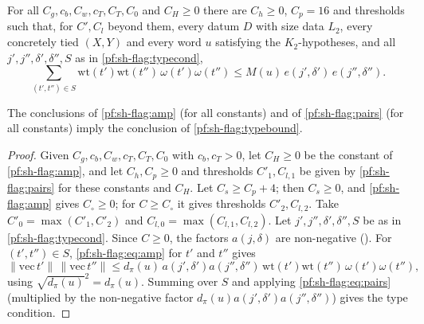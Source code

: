 \begin{proposition}\label{pf:sh-flag:pairs}
For all $C_g,c_b,C_w,c_T,C_T,C_0$ and $C_H\ge0$ there are $C_h\ge0$, $C_p=16$ and thresholds such that, for $C',C_l$ beyond them,
every datum $D$ with size data $L_2$, every concretely tied $(X,Y)$ and every word $u$ satisfying the $K_2$-hypotheses, and all
$j',j'',\delta',\delta'',S$ as in \cref{pf:sh-flag:typecond},
\begin{equation}\label{pf:sh-flag:eq:pairs}
\sum_{(t',t'')\in S}\mathrm{wt}(t')\mathrm{wt}(t'')\,\omega(t')\omega(t'')\le M(u)\,e(j',\delta')\,e(j'',\delta'').
\end{equation}
\end{proposition}

\begin{lemma}[Combination]\label{pf:sh-flag:comb}
The conclusions of \cref{pf:sh-flag:amp} (for all constants) and of \cref{pf:sh-flag:pairs} (for all constants) imply the
conclusion of \cref{pf:sh-flag:typebound}.
\end{lemma}

\begin{proof}
Given $C_g,c_b,C_w,c_T,C_T,C_0$ with $c_b,c_T>0$, let $C_H\ge0$ be the constant of \cref{pf:sh-flag:amp}, and let $C_h,C_p\ge0$
and thresholds $C'_1,C_{l,1}$ be given by \cref{pf:sh-flag:pairs} for these constants and $C_H$. Let $C_s\ge C_p+4$; then
$C_s\ge0$, and \cref{pf:sh-flag:amp} gives $C_\circ\ge0$; for $C\ge C_\circ$ it gives thresholds $C'_2,C_{l,2}$. Take
$C'_0=\max(C'_1,C'_2)$ and $C_{l,0}=\max(C_{l,1},C_{l,2})$. Let $j',j'',\delta',\delta'',S$ be as in \cref{pf:sh-flag:typecond}. Since
$C\ge0$, the factors $a(j,\delta)$ are non-negative (). For
$(t',t'')\in S$, \eqref{pf:sh-flag:eq:amp} for $t'$ and $t''$ gives
\[
\|\mathrm{vec}\,t'\|\,\|\mathrm{vec}\,t''\|\le d_\pi(u)\,a(j',\delta')a(j'',\delta'')\,\mathrm{wt}(t')\mathrm{wt}(t'')\,\omega(t')\omega(t''),
\]
using $\sqrt{d_\pi(u)}^2=d_\pi(u)$. Summing over $S$ and applying \eqref{pf:sh-flag:eq:pairs} (multiplied by the non-negative
factor $d_\pi(u)a(j',\delta')a(j'',\delta'')$) gives the type condition.
\end{proof}

